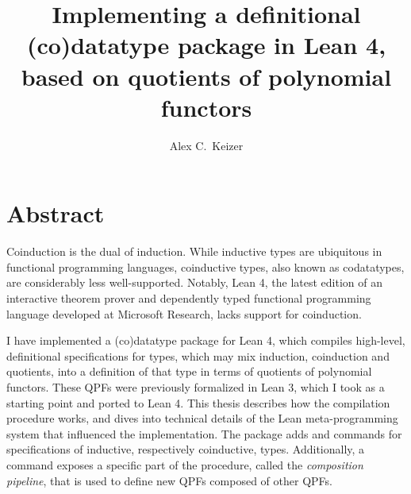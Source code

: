 
%
%
\title{Implementing a definitional (co)datatype package in Lean 4, based on quotients of polynomial functors}
\author{Alex C.\ Keizer}
\maketitle


\section*{Abstract}
Coinduction is the dual of induction. While inductive types are ubiquitous in functional programming
languages, coinductive types, also known as codatatypes, are considerably less well-supported.
Notably, Lean 4, the latest edition of an interactive theorem prover and dependently typed functional 
programming language developed at Microsoft Research, lacks support for coinduction.

I have implemented a (co)datatype package for Lean 4, which compiles high-level, definitional
specifications for types, which may mix induction, coinduction and quotients, into a definition
of that type in terms of quotients of polynomial functors.
These QPFs were previously formalized in Lean 3, which I took as a starting point and ported to Lean 4.
This thesis describes how the compilation procedure works, and dives into technical details of the Lean
meta-programming system that influenced the implementation.
The package adds \data{} and \codata{} commands for specifications of inductive, respectively coinductive, 
types. Additionally, a \qpf{} command exposes a specific part of the procedure, called the \emph{composition pipeline},
that is used to define new QPFs composed of other QPFs.






